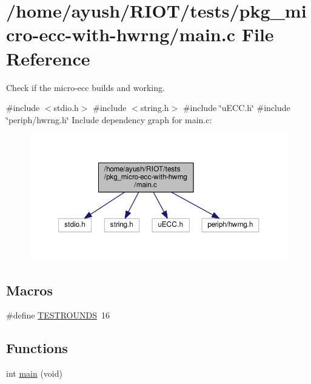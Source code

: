 \hypertarget{pkg__micro-ecc-with-hwrng_2main_8c}{}\section{/home/ayush/\+R\+I\+O\+T/tests/pkg\+\_\+micro-\/ecc-\/with-\/hwrng/main.c File Reference}
\label{pkg__micro-ecc-with-hwrng_2main_8c}


Check if the micro-\/ecc builds and working.  


{\ttfamily \#include $<$stdio.\+h$>$}\newline
{\ttfamily \#include $<$string.\+h$>$}\newline
{\ttfamily \#include \char`\"{}u\+E\+C\+C.\+h\char`\"{}}\newline
{\ttfamily \#include \char`\"{}periph/hwrng.\+h\char`\"{}}\newline
Include dependency graph for main.\+c\+:
\nopagebreak
\begin{figure}[H]
\begin{center}
\leavevmode
\includegraphics[width=350pt]{pkg__micro-ecc-with-hwrng_2main_8c__incl}
\end{center}
\end{figure}
\subsection*{Macros}
\begin{DoxyCompactItemize}
\item 
\#define \hyperlink{pkg__micro-ecc-with-hwrng_2main_8c_af923d96bdee3816363ed1cc4b7c82ad2}{T\+E\+S\+T\+R\+O\+U\+N\+DS}~16
\end{DoxyCompactItemize}
\subsection*{Functions}
\begin{DoxyCompactItemize}
\item 
int \hyperlink{pkg__micro-ecc-with-hwrng_2main_8c_a840291bc02cba5474a4cb46a9b9566fe}{main} (void)
\end{DoxyCompactItemize}


